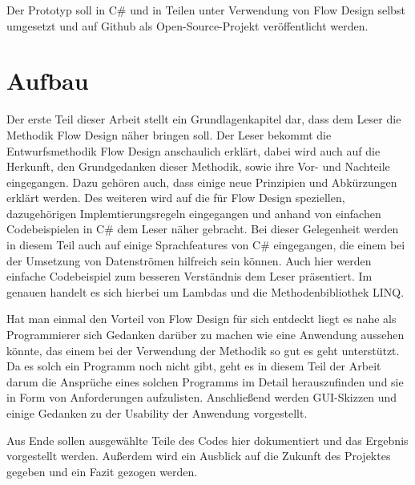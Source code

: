 Der Prototyp soll in C\# und in Teilen unter Verwendung von Flow Design selbst umgesetzt und auf
Github als  Open-Source-Projekt veröffentlicht werden.



\section{Aufbau}

Der erste Teil dieser Arbeit stellt ein Grundlagenkapitel dar, dass dem Leser die Methodik Flow Design näher bringen soll.
Der Leser bekommt die Entwurfsmethodik Flow Design anschaulich erklärt, dabei wird auch auf die Herkunft,
den Grundgedanken dieser Methodik, sowie ihre Vor- und Nachteile eingegangen.
Dazu gehören auch, dass einige neue Prinzipien und Abkürzungen erklärt werden.
Des weiteren wird auf die für Flow Design speziellen, dazugehörigen Implemtierungsregeln eingegangen und
anhand von einfachen Codebeispielen in C\# dem Leser näher gebracht. 
Bei dieser Gelegenheit werden in diesem Teil auch auf einige Sprachfeatures 
von C\# eingegangen, die einem bei der Umsetzung von Datenströmen hilfreich sein
können. Auch hier werden einfache Codebeispiel zum besseren Verständnis dem Leser 
präsentiert. Im genauen handelt es sich hierbei um Lambdas und die Methodenbibliothek LINQ.

Hat man einmal den Vorteil von Flow Design für sich entdeckt liegt es nahe als
Programmierer sich Gedanken darüber zu machen wie eine Anwendung aussehen
könnte, das einem bei der Verwendung der Methodik so gut es geht unterstützt.
Da es solch ein Programm noch nicht gibt, geht es in diesem Teil der Arbeit
darum die Ansprüche eines solchen Programms im Detail herauszufinden und sie
in Form von Anforderungen aufzulisten. Anschließend werden GUI-Skizzen
und einige Gedanken zu der Usability der Anwendung vorgestellt. 

Aus Ende sollen ausgewählte Teile des Codes hier dokumentiert und das Ergebnis vorgestellt werden.
Außerdem wird ein Ausblick auf die Zukunft des Projektes gegeben und ein Fazit gezogen werden.

